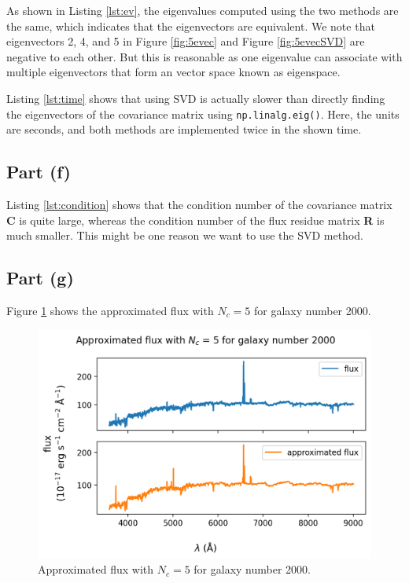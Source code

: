 \documentclass[11pt]{article}
\begin{document}
As shown in Listing \ref{lst:ev}, the eigenvalues computed using the two methods are the same, which indicates that the eigenvectors are equivalent. We note that eigenvectors 2, 4, and 5 in Figure \ref{fig:5evec} and Figure \ref{fig:5evecSVD} are negative to each other. But this is reasonable as one eigenvalue can associate with multiple eigenvectors that form an vector space known as eigenspace.

Listing \ref{lst:time} shows that using SVD is actually slower than directly finding the eigenvectors of the covariance matrix using \texttt{np.linalg.eig()}. Here, the units are seconds, and both methods are implemented twice in the shown time.


\subsection{Part (f)}
Listing \ref{lst:condition} shows that the condition number of the covariance matrix \textbf{C} is quite large, whereas the condition number of the flux residue matrix \textbf{R} is much smaller. This might be one reason we want to use the SVD method.


\subsection{Part (g)}
Figure \ref{fig:approx} shows the approximated flux with $N_c = 5$ for galaxy number 2000.
\begin{figure}[H]
    \centering
    \includegraphics[scale = 0.75]{images/ps6-1g.png}
    \caption{Approximated flux with $N_c = 5$ for galaxy number 2000.}
    \label{fig:approx}
\end{figure}
\end{document}
